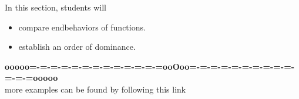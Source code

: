\documentclass{ximera}
\begin{document}
\begin{sectionOutcomes}
In this section, students will 

\begin{itemize}
\item compare endbehaviors of functions.
\item establish an order of dominance.
\end{itemize}
\end{sectionOutcomes}


















\begin{center}
\textbf{\textcolor{green!50!black}{ooooo=-=-=-=-=-=-=-=-=-=-=-=-=ooOoo=-=-=-=-=-=-=-=-=-=-=-=-=ooooo}} \\

more examples can be found by following this link\\ 

\end{center}
\end{document}
